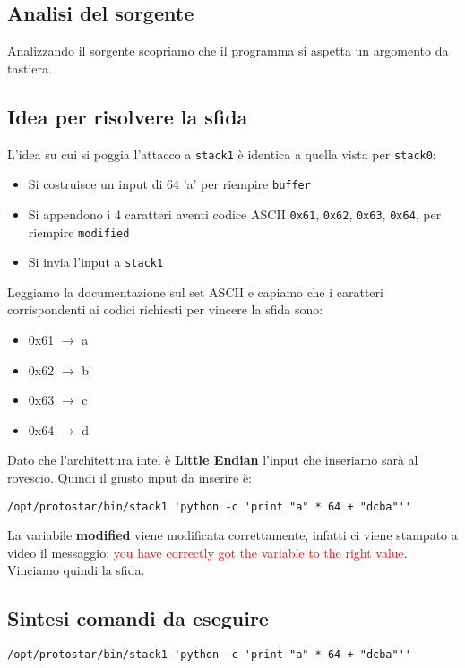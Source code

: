 \subsection{Analisi del sorgente}
Analizzando il sorgente scopriamo che il programma si aspetta un argomento da tastiera.

\subsection{Idea per risolvere la sfida}
L'idea su cui si poggia l'attacco a \texttt{stack1} è identica a quella vista per \texttt{stack0}:
\begin{itemize}
    \item Si costruisce un input di 64 'a' per riempire \texttt{buffer}
    \item Si appendono i 4 caratteri aventi codice ASCII \texttt{0x61}, \texttt{0x62}, \texttt{0x63}, \texttt{0x64}, per riempire \texttt{modified}
    \item Si invia l'input a \texttt{stack1}
\end{itemize}

Leggiamo la documentazione sul set ASCII e capiamo che i caratteri corrispondenti ai codici richiesti per vincere la sfida sono:
\begin{itemize}
    \item 0x61 $\rightarrow$ a
    \item 0x62 $\rightarrow$ b
    \item 0x63 $\rightarrow$ c
    \item 0x64 $\rightarrow$ d
\end{itemize}

Dato che l'architettura intel è \textbf{Little Endian} l'input che inseriamo sarà al rovescio. Quindi il giusto input da inserire è:
\begin{lstlisting}[style=bashstyle]
    /opt/protostar/bin/stack1 'python -c 'print "a" * 64 + "dcba"'' 
\end{lstlisting}
La variabile \textbf{modified} viene modificata correttamente, infatti ci viene stampato a video il messaggio: \textcolor{red}{you have correctly got the variable to the right value}. Vinciamo quindi la sfida.

\subsection{Sintesi comandi da eseguire}
\begin{lstlisting}[style=bashstyle]
    /opt/protostar/bin/stack1 'python -c 'print "a" * 64 + "dcba"'' 
\end{lstlisting}


